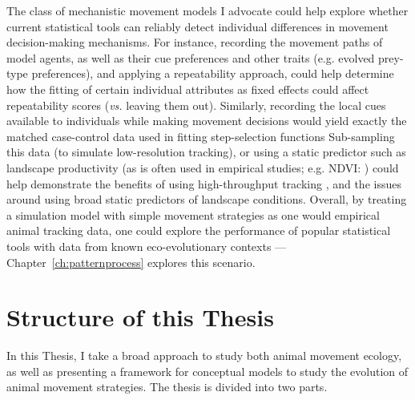 The class of mechanistic movement models I advocate could help explore whether current statistical tools can reliably detect individual differences in movement decision-making mechanisms.
For instance, recording the movement paths of model agents, as well as their cue preferences and other traits (e.g. evolved prey-type preferences), and applying a repeatability approach, could help determine how the fitting of certain individual attributes as fixed effects could affect repeatability scores (\emph{vs.} leaving them out).
Similarly, recording the local cues available to individuals while making movement decisions would yield exactly the matched case-control data used in fitting step-selection functions \parencite[see][]{signer2019}
Sub-sampling this data (to simulate low-resolution tracking), or using a static predictor such as landscape productivity (as is often used in empirical studies; e.g. NDVI: \cite{pettorelli2011}) could help demonstrate the benefits of using high-throughput tracking \parencite{nathan2022}, and the issues around using broad static predictors of landscape conditions.
Overall, by treating a simulation model with simple movement strategies as one would empirical animal tracking data, one could explore the performance of popular statistical tools with data from known eco-evolutionary contexts --- Chapter~\ref{ch:patternprocess} explores this scenario.

\section*{Structure of this Thesis}

In this Thesis, I take a broad approach to study both animal movement ecology, as well as presenting a framework for conceptual models to study the evolution of animal movement strategies. The thesis is divided into two parts.

\medskip

